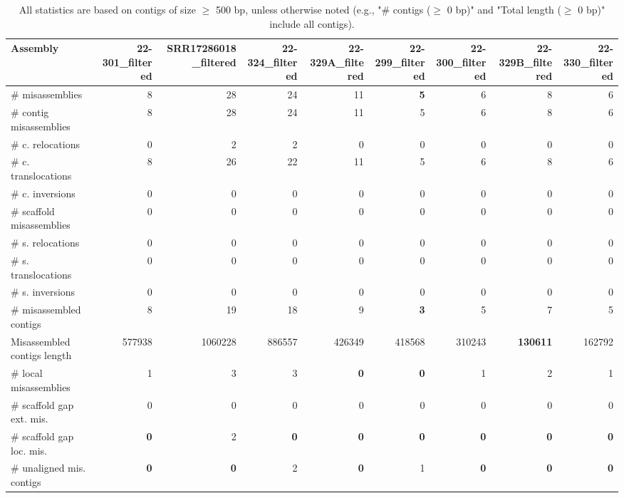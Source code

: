 \documentclass[12pt,a4paper]{article}
\begin{document}
\begin{table}[ht]
\begin{center}
\caption{All statistics are based on contigs of size $\geq$ 500 bp, unless otherwise noted (e.g., "\# contigs ($\geq$ 0 bp)" and "Total length ($\geq$ 0 bp)" include all contigs).}
\begin{tabular}{|l*{8}{|r}|}
\hline
Assembly & 22-301\_filtered & SRR17286018\_filtered & 22-324\_filtered & 22-329A\_filtered & 22-299\_filtered & 22-300\_filtered & 22-329B\_filtered & 22-330\_filtered \\ \hline
\# misassemblies & 8 & 28 & 24 & 11 & {\bf 5} & 6 & 8 & 6 \\ \hline
\hspace{2mm}\# contig misassemblies & 8 & 28 & 24 & 11 & 5 & 6 & 8 & 6 \\ \hline
\hspace{5mm}\# c. relocations & 0 & 2 & 2 & 0 & 0 & 0 & 0 & 0 \\ \hline
\hspace{5mm}\# c. translocations & 8 & 26 & 22 & 11 & 5 & 6 & 8 & 6 \\ \hline
\hspace{5mm}\# c. inversions & 0 & 0 & 0 & 0 & 0 & 0 & 0 & 0 \\ \hline
\hspace{2mm}\# scaffold misassemblies & 0 & 0 & 0 & 0 & 0 & 0 & 0 & 0 \\ \hline
\hspace{5mm}\# s. relocations & 0 & 0 & 0 & 0 & 0 & 0 & 0 & 0 \\ \hline
\hspace{5mm}\# s. translocations & 0 & 0 & 0 & 0 & 0 & 0 & 0 & 0 \\ \hline
\hspace{5mm}\# s. inversions & 0 & 0 & 0 & 0 & 0 & 0 & 0 & 0 \\ \hline
\# misassembled contigs & 8 & 19 & 18 & 9 & {\bf 3} & 5 & 7 & 5 \\ \hline
Misassembled contigs length & 577938 & 1060228 & 886557 & 426349 & 418568 & 310243 & {\bf 130611} & 162792 \\ \hline
\# local misassemblies & 1 & 3 & 3 & {\bf 0} & {\bf 0} & 1 & 2 & 1 \\ \hline
\# scaffold gap ext. mis. & 0 & 0 & 0 & 0 & 0 & 0 & 0 & 0 \\ \hline
\# scaffold gap loc. mis. & {\bf 0} & 2 & {\bf 0} & {\bf 0} & {\bf 0} & {\bf 0} & {\bf 0} & {\bf 0} \\ \hline
\# unaligned mis. contigs & {\bf 0} & {\bf 0} & 2 & {\bf 0} & 1 & {\bf 0} & {\bf 0} & {\bf 0} \\ \hline

\end{tabular}
\end{center}
\end{table}
\end{document}
